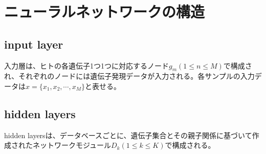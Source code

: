 \documentclass[a4paper,12pt]{jsreport}
\begin{document}
\section{ニューラルネットワークの構造}
\begin{comment}
\#\#\#\#\#\#\#\#\#\#\# \\
input layer、hidden layer、output layerについて全体と図\\
input layerについて\\
hidden layerについて(GO・ractomeとMSigDBのモジュール設計手法)\\
ノードの数の決め方、エッジの計算方法、tanhとbatchnorm\\
output layerについて\\
\#\#\#\#\#\#\#\#\#\#\# \\
\end{comment}


\subsection{input layer}
入力層は、ヒトの各遺伝子1つ1つに対応するノード$g_m(1\leq n\leq M)$で構成され、それぞれのノードには遺伝子発現データが入力される。各サンプルの入力データは$x = \{x_1, x_2, \cdots, x_M\}$と表せる。


\subsection{hidden layers}
hidden layersは、データベースごとに、遺伝子集合とその親子関係に基づいて作成されたネットワークモジュール$D_k(1\leq k\leq K)$で構成される。
\end{document}
